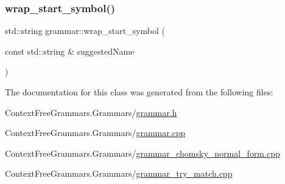\mbox{\label{classgrammar_a151e599b2202fe4cb3beee2f8807c3fd}} 
\subsubsection{\texorpdfstring{wrap\_start\_symbol()}{wrap\_start\_symbol()}\hspace{0.1cm}{\footnotesize\ttfamily [2/2]}}
{\footnotesize\ttfamily std\+::string grammar\+::wrap\+\_\+start\+\_\+symbol (\begin{DoxyParamCaption}\item[{const std\+::string \&}]{suggested\+Name }\end{DoxyParamCaption})}



The documentation for this class was generated from the following files\+:\begin{DoxyCompactItemize}
\item 
Context\+Free\+Grammars.\+Grammars/\mbox{\hyperlink{grammar_8h}{grammar.\+h}}\item 
Context\+Free\+Grammars.\+Grammars/\mbox{\hyperlink{grammar_8cpp}{grammar.\+cpp}}\item 
Context\+Free\+Grammars.\+Grammars/\mbox{\hyperlink{grammar__chomsky__normal__form_8cpp}{grammar\+\_\+chomsky\+\_\+normal\+\_\+form.\+cpp}}\item 
Context\+Free\+Grammars.\+Grammars/\mbox{\hyperlink{grammar__try__match_8cpp}{grammar\+\_\+try\+\_\+match.\+cpp}}\end{DoxyCompactItemize}
